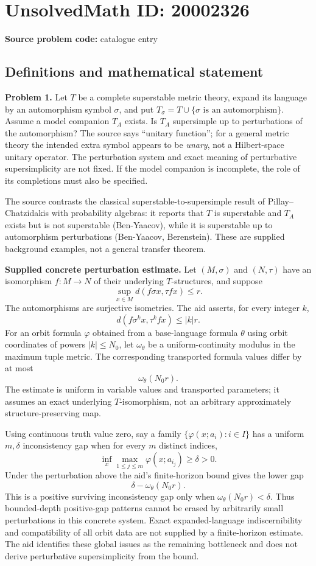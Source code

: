 \documentclass[11pt]{article}
\begin{document}
\section*{UnsolvedMath ID: 20002326}
\textbf{Source problem code:} catalogue entry
\subsection{Definitions and mathematical statement}
\textbf{Problem 1.} Let $T$ be a complete superstable metric theory, expand its language by an automorphism symbol $\sigma$, and put $T_\sigma=T\cup\{\sigma\text{ is an automorphism}\}$. Assume a model companion $T_A$ exists. Is $T_A$ supersimple up to perturbations of the automorphism? The source says ``unitary function''; for a general metric theory the intended extra symbol appears to be \emph{unary}, not a Hilbert-space unitary operator. The perturbation system and exact meaning of perturbative supersimplicity are not fixed. If the model companion is incomplete, the role of its completions must also be specified.

The source contrasts the classical superstable-to-supersimple result of Pillay--Chatzidakis with probability algebras: it reports that $T$ is superstable and $T_A$ exists but is not superstable (Ben-Yaacov), while it is superstable up to automorphism perturbations (Ben-Yaacov, Berenstein). These are supplied background examples, not a general transfer theorem.

\textbf{Supplied concrete perturbation estimate.} Let $(M,\sigma)$ and $(N,\tau)$ have an isomorphism $f:M\to N$ of their underlying $T$-structures, and suppose
\[
 \sup_{x\in M}d(f\sigma x,\tau f x)\le r.
\]
The automorphisms are surjective isometries. The aid asserts, for every integer $k$,
\[
 d(f\sigma^kx,\tau^kf x)\le|k|r.
\]
For an orbit formula $\varphi$ obtained from a base-language formula $\theta$ using orbit coordinates of powers $|k|\le N_0$, let $\omega_\theta$ be a uniform-continuity modulus in the maximum tuple metric. The corresponding transported formula values differ by at most
\[
 \omega_\theta(N_0r).
\]
The estimate is uniform in variable values and transported parameters; it assumes an exact underlying $T$-isomorphism, not an arbitrary approximately structure-preserving map.

Using continuous truth value zero, say a family $\{\varphi(x;a_i):i\in I\}$ has a uniform $m,\delta$ inconsistency gap when for every $m$ distinct indices,
\[
 \inf_x\max_{1\le j\le m}\varphi(x;a_{i_j})\ge\delta>0.
\]
Under the perturbation above the aid's finite-horizon bound gives the lower gap
\[
 \delta-\omega_\theta(N_0r).
\]
This is a positive surviving inconsistency gap only when $\omega_\theta(N_0r)<\delta$. Thus bounded-depth positive-gap patterns cannot be erased by arbitrarily small perturbations in this concrete system. Exact expanded-language indiscernibility and compatibility of all orbit data are not supplied by a finite-horizon estimate. The aid identifies these global issues as the remaining bottleneck and does not derive perturbative supersimplicity from the bound.
\end{document}

